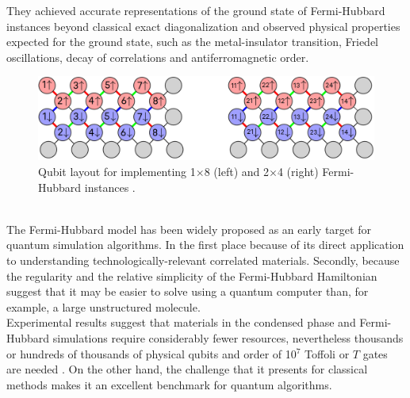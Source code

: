 They achieved accurate representations of the ground state of Fermi-Hubbard instances beyond classical exact diagonalization and observed physical properties expected for the ground state, such as the metal-insulator transition, Friedel oscillations, decay of correlations and antiferromagnetic order.
\begin{figure}[ht]
  \centering
  \includegraphics[width=\textwidth]{figures/Qubit layout Fermi-Hubbard.png}
  \caption{Qubit layout for implementing 1$\times$8 (left) and 2$\times$4 (right) Fermi-Hubbard instances \cite{Stanisic2021Dec}.} \label{Qubit layout Fermi-Hubbard}
\end{figure} \\
The Fermi-Hubbard model has been widely proposed as an early target for quantum simulation algorithms. In the first place because of its direct application to understanding technologically-relevant correlated materials. Secondly, because the regularity and the relative simplicity of the Fermi-Hubbard Hamiltonian suggest that it may be easier to solve using a quantum computer than, for example, a large unstructured molecule. \\
Experimental results suggest that materials in the condensed phase and Fermi-Hubbard simulations require considerably fewer resources, nevertheless thousands or hundreds of thousands of physical qubits and order of 10$^7$ Toffoli or $T$ gates are needed \cite{McArdle2020Mar}. On the other hand, the challenge that it presents for classical methods makes it an excellent benchmark for quantum algorithms.